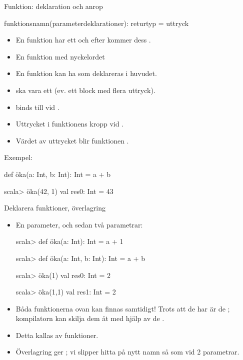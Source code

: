 \begin{Slide}{Funktion: deklaration och anrop}
\SlideOnly{\setlength{\leftmargini}{0pt}}

 funktionsnamn(parameterdeklarationer): returtyp = uttryck
\vspace{0.5em}


\begin{itemize}\SlideFontSmall
  \item En funktion har ett  och efter \code{=} kommer dess .
  \item En  funktion  med nyckelordet 
  \item En funktion kan ha  som deklareras i huvudet. 
  \item {} ska vara ett  (ev. ett block med flera uttryck).
  \item {} binds till  vid .
  \item Uttrycket i funktionens kropp  vid . 
  \item Värdet av uttrycket blir funktionen . 
\end{itemize}

\pause
Exempel:
\begin{Code}
def öka(a: Int, b: Int): Int = a + b
\end{Code}
\pause
\begin{REPLnonum}
scala> öka(42, 1)
val res0: Int = 43
\end{REPLnonum}

\end{Slide}


\begin{Slide}{Deklarera funktioner, överlagring}
\begin{itemize}
\item En parameter, och sedan två parametrar:
\begin{REPL}
scala> def öka(a: Int): Int = a + 1

scala> def öka(a: Int, b: Int): Int = a + b

scala> öka(1)
val res0: Int = 2

scala> öka(1,1)
val res1: Int = 2

\end{REPL}
\item Båda funktionerna ovan kan finnas samtidigt! Trots att de har  är de ; kompilatorn kan skilja dem åt med hjälp av de .

\item Detta kallas   av funktioner.
\item Överlagring ger ; vi slipper hitta på nytt namn så som  vid 2 parametrar.
\end{itemize}
\end{Slide}



